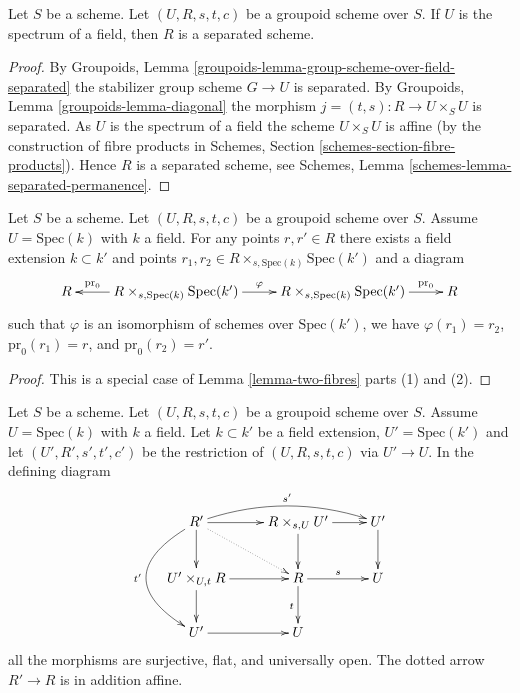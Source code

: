 \begin{lemma}
\label{lemma-groupoid-on-field-separated}
Let $S$ be a scheme. Let $(U, R, s, t, c)$ be a groupoid scheme
over $S$. If $U$ is the spectrum of a field,
then $R$ is a separated scheme.
\end{lemma}

\begin{proof}
By
Groupoids, Lemma \ref{groupoids-lemma-group-scheme-over-field-separated}
the stabilizer group scheme $G \to U$ is separated. By
Groupoids, Lemma \ref{groupoids-lemma-diagonal}
the morphism $j = (t, s) : R \to U \times_S U$ is separated.
As $U$ is the spectrum of a field the scheme
$U \times_S U$ is affine (by the construction of fibre products in
Schemes, Section \ref{schemes-section-fibre-products}).
Hence $R$ is a separated scheme, see
Schemes, Lemma \ref{schemes-lemma-separated-permanence}.
\end{proof}

\begin{lemma}
\label{lemma-groupoid-on-field-homogeneous}
Let $S$ be a scheme. Let $(U, R, s, t, c)$ be a groupoid scheme
over $S$. Assume $U = \text{Spec}(k)$ with $k$ a field.
For any points $r, r' \in R$ there exists a field extension
$k \subset k'$ and points
$r_1, r_2 \in R \times_{s, \text{Spec}(k)} \text{Spec}(k')$
and a diagram
$$
\xymatrix{
R &
R \times_{s, \text{Spec}(k)} \text{Spec}(k')
\ar[l]_-{\text{pr}_0} \ar[r]^\varphi &
R \times_{s, \text{Spec}(k)} \text{Spec}(k')
\ar[r]^-{\text{pr}_0} &
R
}
$$
such that $\varphi$ is an isomorphism of schemes over $\text{Spec}(k')$,
we have $\varphi(r_1) = r_2$, $\text{pr}_0(r_1) = r$, and
$\text{pr}_0(r_2) = r'$.
\end{lemma}

\begin{proof}
This is a special case of
Lemma \ref{lemma-two-fibres}
parts (1) and (2).
\end{proof}

\begin{lemma}
\label{lemma-restrict-groupoid-on-field}
Let $S$ be a scheme. Let $(U, R, s, t, c)$ be a groupoid scheme
over $S$. Assume $U = \text{Spec}(k)$ with $k$ a field.
Let $k \subset k'$ be a field extension, $U' = \text{Spec}(k')$
and let $(U', R', s', t', c')$ be the restriction of
$(U, R, s, t, c)$ via $U' \to U$. In the defining diagram
$$
\xymatrix{
R' \ar[d] \ar[r] \ar@/_3pc/[dd]_{t'} \ar@/^1pc/[rr]^{s'} \ar@{..>}[rd] &
R \times_{s, U} U' \ar[r] \ar[d] &
U' \ar[d] \\
U' \times_{U, t} R \ar[d] \ar[r] &
R \ar[r]^s \ar[d]_t &
U \\
U' \ar[r] &
U
}
$$
all the morphisms are surjective, flat, and universally open.
The dotted arrow $R' \to R$ is in addition affine.
\end{lemma}

